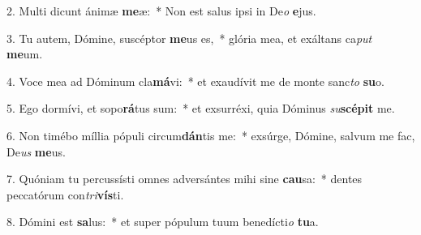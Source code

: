 2. Multi dicunt ánimæ \textbf{me}æ:~*  Non est salus ipsi in De\textit{o} \textbf{e}jus.\

3. Tu autem, Dómine, suscéptor \textbf{me}us es,~*  glória mea, et exáltans ca\textit{put} \textbf{me}um.\

4. Voce mea ad Dóminum cla\textbf{má}vi:~*  et exaudívit me de monte sanc\textit{to} \textbf{su}o.\

5. Ego dormívi, et sopo\textbf{rá}tus sum:~*  et exsurréxi, quia Dóminus \textit{su}\textbf{scé}\textbf{pit} me.\

6. Non timébo míllia pópuli circum\textbf{dán}tis me:~*  exsúrge, Dómine, salvum me fac, De\textit{us} \textbf{me}us.\

7. Quóniam tu percussísti omnes adversántes mihi sine \textbf{cau}sa:~*  dentes peccatórum con\textit{tri}\textbf{vís}ti.\

8. Dómini est \textbf{sa}lus:~*  et super pópulum tuum benedícti\textit{o} \textbf{tu}a.\

